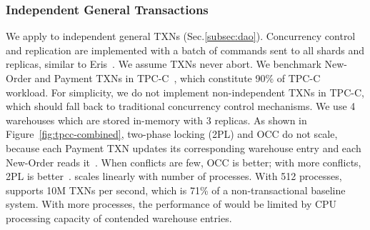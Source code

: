 \subsubsection{Independent General Transactions}
\label{subsec:eval-transactions}

We apply \sys to independent general TXNs (Sec.\ref{subsec:dao}).
Concurrency control and replication are implemented with a batch of commands sent to all shards and replicas, similar to Eris~\cite{eris}.
We assume TXNs never abort.
We benchmark New-Order and Payment TXNs in TPC-C~\cite{tpcc}, which constitute 90\% of TPC-C workload.
For simplicity, we do not implement non-independent TXNs in TPC-C, which should fall back to traditional concurrency control mechanisms.
We use 4 warehouses which are stored in-memory with 3 replicas.
As shown in Figure~\ref{fig:tpcc-combined}, two-phase locking (2PL) and OCC do not scale, because each Payment TXN updates its corresponding warehouse entry and each New-Order reads it~\cite{yu2014staring}.
When conflicts are few, OCC is better; with more conflicts, 2PL is better~\cite{mu2014extracting}.
\sys{} scales linearly with number of processes. With 512 processes, \sys supports 10M TXNs per second, which is 71\% of a non-transactional baseline system. With more processes, the performance of \sys{} would be limited by CPU processing capacity of contended warehouse entries.

